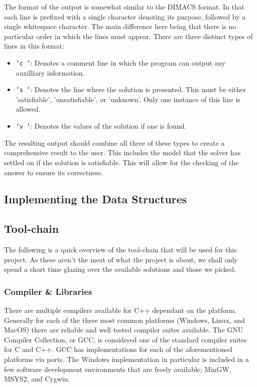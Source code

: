 \documentclass{article}
\begin{document}
The format of the output is somewhat similar to the DIMACS format. In that each line is prefixed
with a single character denoting its purpose, followed by a single whitespace character. The main
difference here being that there is no particular order in which the lines must appear. There are
three distinct types of lines in this format:

\begin{itemize}
    \item \texttt{'c '}: Denotes a comment line in which the program can output any auxilliary
    information.
    \item \texttt{'s '}: Denotes the line where the solution is presented. This must be either
    'satisfiable', 'unsatisfiable', or 'unknown'. Only one instance of this line is allowed.
    \item \texttt{'v '}: Denotes the values of the solution if one is found.
\end{itemize}

The resulting output should combine all three of these types to create a comprehensive result to the
user. This includes the model that the solver has settled on if the solution is satisfiable. This
will allow for the checking of the answer to ensure its correctness.


\subsection{Implementing the Data Structures}

\subsection{Tool-chain}
The following is a quick overview of the tool-chain that will be used for this project. As these aren't the meat of what the project is about, we shall only spend a short time glazing over the available solutions and those we picked.

\subsubsection{Compiler \& Libraries}
There are multiple compilers available for C++ dependant on the platform. Generally for each of the three most common platforms (Windows, Linux, and MacOS) there are reliable and well tested compiler suites available. The GNU Compiler Collection, or GCC, is considered one of the standard compiler suites for C and C++. GCC has implementations for each of the aforementioned platforms via ports. The Windows implementation in particular is included in a few software development environments that are freely available; MinGW, MSYS2, and Cygwin.
\end{document}
